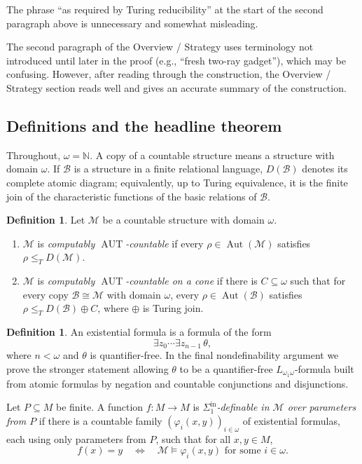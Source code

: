 \documentclass[12pt]{article}
\theoremstyle{definition}
\newtheorem{definition}[theorem]{Definition}
\theoremstyle{remark}
\newcommand{\Aut}{\operatorname{Aut}}
\newcommand{\review}[1]{\begin{reviewbox}#1\end{reviewbox}}
\begin{document}
\review{The phrase ``as required by Turing reducibility'' at the start of the second paragraph above is unnecessary and somewhat misleading.}

\review{The second paragraph of the Overview / Strategy uses terminology not introduced until later in the proof (e.g., ``fresh two-ray gadget''), which may be confusing. However, after reading through the construction, the Overview / Strategy section reads well and gives an accurate summary of the construction.}

\subsection{Definitions and the headline theorem}

Throughout, \(\omega=\mathbb N\).  A copy of a countable structure means a structure with domain \(\omega\).  If \(\mathcal B\) is a structure in a finite relational language, \(D(\mathcal B)\) denotes its complete atomic diagram; equivalently, up to Turing equivalence, it is the finite join of the characteristic functions of the basic relations of \(\mathcal B\).

\begin{definition}
Let \(\mathcal M\) be a countable structure with domain \(\omega\).
\begin{enumerate}
\item \(\mathcal M\) is \emph{computably \(\operatorname{AUT}\)-countable} if every \(\rho\in\Aut(\mathcal M)\) satisfies \(\rho\leq_T D(\mathcal M)\).
\item \(\mathcal M\) is \emph{computably \(\operatorname{AUT}\)-countable on a cone} if there is \(C\subseteq\omega\) such that for every copy \(\mathcal B\cong\mathcal M\) with domain \(\omega\), every \(\rho\in\Aut(\mathcal B)\) satisfies \(\rho\leq_T D(\mathcal B)\oplus C\), where \(\oplus\) is Turing join.
\end{enumerate}
\end{definition}

\begin{definition}
An existential formula is a formula of the form
\[
\exists z_0\cdots \exists z_{n-1}\,\theta,
\]
where \(n<\omega\) and \(\theta\) is quantifier-free.  In the final nondefinability argument we prove the stronger statement allowing \(\theta\) to be a quantifier-free \(L_{\omega_1\omega}\)-formula built from atomic formulas by negation and countable conjunctions and disjunctions.

Let \(P\subseteq M\) be finite.  A function \(f:M\to M\) is \emph{\(\Sigma^{\mathrm{in}}_1\)-definable in \(\mathcal M\) over parameters from \(P\)} if there is a countable family \((\varphi_i(x,y))_{i\in\omega}\) of existential formulas, each using only parameters from \(P\), such that for all \(x,y\in M\),
\[
f(x)=y
\quad\Longleftrightarrow\quad
\mathcal M\models \varphi_i(x,y)\text{ for some }i\in\omega.
\]
\end{definition}
\end{document}
